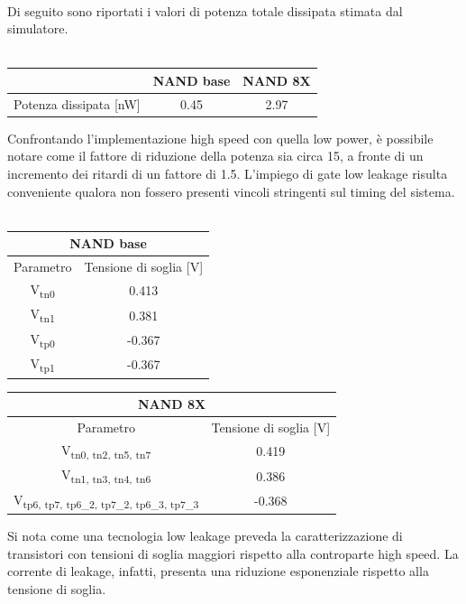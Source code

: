 \documentclass[11pt,  english, makeidx, a4paper, titlepage, oneside]{book}
\begin{document}
\\
Di seguito sono riportati i valori di potenza totale dissipata stimata dal simulatore.
\\\\
\begin{center}
	\begin{tabular}{|c|c|c|}
	\hline
	& NAND base & NAND 8X\\
	\hline
	Potenza dissipata [nW] & 0.45 & 2.97\\
	\hline
	\end{tabular}	
\end{center}
\vspace{0.3cm}
Confrontando l'implementazione high speed con quella low power, è possibile notare come il fattore di riduzione della potenza sia circa 15, a fronte di un incremento dei ritardi di un fattore di 1.5. L'impiego di gate low leakage risulta conveniente qualora non fossero presenti vincoli stringenti sul timing del sistema.
\\\\
\begin{center}
	\begin{tabular}{|c|c|}
	\hline
	 \multicolumn{2}{|c|}{NAND base} \\
	\hline
	Parametro & Tensione di soglia [V] \\
	\hline
	 V\textsubscript{tn0} & 0.413\\
	\hline
	 V\textsubscript{tn1} & 0.381 \\
	\hline
	V\textsubscript{tp0} & -0.367 \\
	\hline
	V\textsubscript{tp1} & -0.367 \\
	\hline
	\end{tabular}	
	\begin{tabular}{|c|c|}
	\hline
	 \multicolumn{2}{|c|}{NAND 8X} \\
	\hline
	Parametro & Tensione di soglia [V] \\
	\hline
	 V\textsubscript{tn0, tn2, tn5, tn7} & 0.419\\
	\hline
	 V\textsubscript{tn1, tn3, tn4, tn6} & 0.386 \\
	\hline
	V\textsubscript{tp6, tp7, tp6\_2, tp7\_2, tp6\_3, tp7\_3} & -0.368 \\
	\hline
	\end{tabular}
\end{center}
\vspace{0.3cm}
Si nota come una tecnologia low leakage preveda la caratterizzazione di transistori con tensioni di soglia maggiori rispetto alla controparte high speed. La corrente di leakage, infatti, presenta una riduzione esponenziale rispetto alla tensione di soglia.
\newpage
\end{document}
